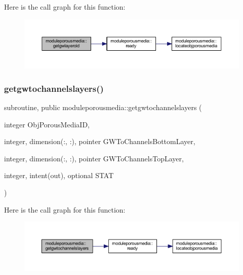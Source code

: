 Here is the call graph for this function\+:\nopagebreak
\begin{figure}[H]
\begin{center}
\leavevmode
\includegraphics[width=350pt]{namespacemoduleporousmedia_aa697c2ff7c0b471220e55d71bd4c665a_cgraph}
\end{center}
\end{figure}
\mbox{\label{namespacemoduleporousmedia_a742d19854f8590b5db164ac97052d8c3}} 
\subsubsection{\texorpdfstring{getgwtochannelslayers()}{getgwtochannelslayers()}}
{\footnotesize\ttfamily subroutine, public moduleporousmedia\+::getgwtochannelslayers (\begin{DoxyParamCaption}\item[{integer}]{Obj\+Porous\+Media\+ID,  }\item[{integer, dimension(\+:, \+:), pointer}]{G\+W\+To\+Channels\+Bottom\+Layer,  }\item[{integer, dimension(\+:, \+:), pointer}]{G\+W\+To\+Channels\+Top\+Layer,  }\item[{integer, intent(out), optional}]{S\+T\+AT }\end{DoxyParamCaption})}

Here is the call graph for this function\+:\nopagebreak
\begin{figure}[H]
\begin{center}
\leavevmode
\includegraphics[width=350pt]{namespacemoduleporousmedia_a742d19854f8590b5db164ac97052d8c3_cgraph}
\end{center}
\end{figure}
\mbox{\label{namespacemoduleporousmedia_a19324728630ae49f29d577f63d3f8523}} 
